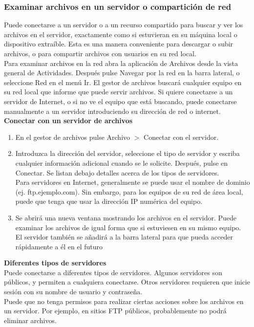 \subsubsection{Examinar archivos en un servidor o compartición de red}
Puede conectarse a un servidor o a un recurso compartido para buscar y ver los archivos en el servidor, exactamente como si estuvieran en su máquina local o dispositivo extraíble. Esta es una manera conveniente para descargar o subir archivos, o para compartir archivos con usuarios en su red local.\\
Para examinar archivos en la red abra la aplicación de Archivos desde la vista general de Actividades. Después pulse Navegar por la red en la barra lateral, o seleccione Red en el menú Ir. El gestor de archivos buscará cualquier equipo en su red local que informe que puede servir archivos. Si quiere conectarse a un servidor de Internet, o si no ve el equipo que está buscando, puede conectarse manualmente a un servidor introduciendo su dirección de red o internet.\\

{\bf Conectar con un servidor de archivos}\\
\begin{enumerate}
\item En el gestor de archivos pulse Archivo $>$ Conectar con el servidor.
\item Introduzca la dirección del servidor, seleccione el tipo de servidor y escriba cualquier información adicional cuando se le solicite. Después, pulse en Conectar. Se listan debajo detalles acerca de los tipos de servidores.\\
Para servidores en Internet, generalmente se puede usar el nombre de dominio (ej. ftp.ejemplo.com). Sin embargo, para los equipos de su red de área local, puede que tenga que usar la dirección IP numérica del equipo.
\item Se abrirá una nueva ventana mostrando los archivos en el servidor. Puede examinar los archivos de igual forma que si estuviesen en su mismo equipo.\\

El servidor también se añadirá a la barra lateral para que pueda acceder rápidamente a él en el futuro
\end{enumerate}
{\bf Diferentes tipos de servidores}\\
Puede conectarse a diferentes tipos de servidores. Algunos servidores son públicos, y permiten a cualquiera conectarse. Otros servidores requieren que inicie sesión con su nombre de usuario y contraseña.\\
Puede que no tenga permisos para realizar ciertas acciones sobre los archivos en un servidor. Por ejemplo, en sitios FTP públicos, probablemente no podrá eliminar archivos.\\

